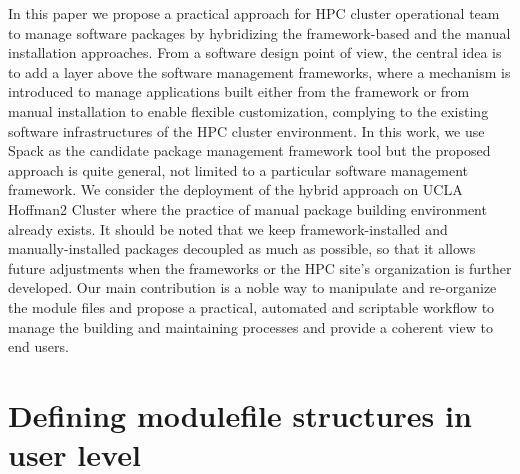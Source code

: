\documentclass[conference]{IEEEtran}
\begin{document}
In this paper we propose a practical approach for HPC cluster operational team to manage software packages by hybridizing the framework-based and the manual installation approaches. 
From a software design point of view, the central idea is to add a layer above the software management frameworks, where a mechanism is introduced to manage applications built either from the framework or from manual installation to enable flexible customization, complying to the existing software infrastructures of the HPC cluster environment.
In this work, we use Spack as the candidate package management framework tool but the proposed approach is quite general, not limited to a particular software management framework. We consider the deployment of the hybrid approach on UCLA Hoffman2 Cluster where the practice of manual package building environment already exists.
It should be noted that we keep framework-installed and manually-installed packages decoupled as much as possible, so that it allows future adjustments when the frameworks or the HPC site's organization is further developed. 
Our main contribution is a noble way to manipulate and re-organize the module files and propose a practical, automated and scriptable workflow to manage the building and maintaining processes and provide a coherent view to end users.



\section{Defining modulefile structures in user level} \label{subsec_redefine_h2_modulefiles}

\end{document}
